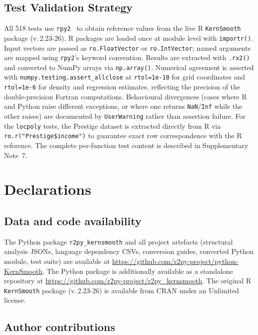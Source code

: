 \documentclass[12pt,a4paper]{article}
\newcommand{\pkg}[1]{\texttt{#1}}
\newcommand{\suppnote}[1]{Supplementary Note~#1}
\begin{document}
\subsection{Test Validation Strategy}

All 518 tests use \pkg{rpy2}~\cite{gautier2008rpy2} to obtain reference values from the live R \pkg{KernSmooth} package (v.\,2.23-26). R packages are loaded once at module level with \texttt{importr()}. Input vectors are passed as \texttt{ro.FloatVector} or \texttt{ro.IntVector}; named arguments are mapped using \texttt{rpy2}'s keyword convention. Results are extracted with \texttt{.rx2()} and converted to NumPy arrays via \texttt{np.array()}. Numerical agreement is asserted with \texttt{numpy.testing.assert\_allclose} at \texttt{rtol=1e-10} for grid coordinates and \texttt{rtol=1e-6} for density and regression estimates, reflecting the precision of the double-precision Fortran computations. Behavioural divergences (cases where R and Python raise different exceptions, or where one returns \texttt{NaN}/\texttt{Inf} while the other raises) are documented by \texttt{UserWarning} rather than assertion failure. For the \texttt{locpoly} tests, the Prestige dataset is extracted directly from R via \texttt{ro.r("Prestige\$income")} to guarantee exact row correspondence with the R reference. The complete per-function test content is described in \suppnote{7}.

\section*{Declarations}

\subsection*{Data and code availability}

The Python package \pkg{r2py\_kernsmooth} and all project artefacts (structural analysis JSONs, language dependency CSVs, conversion guides, converted Python module, test suite) are available at \url{https://github.com/r2py-project/python-KernSmooth}. The Python package is additionally available as a standalone repository at \url{https://github.com/r2py-project/r2py\_kernsmooth}. The original R \pkg{KernSmooth} package (v.\,2.23-26) is available from CRAN under an Unlimited license.

\subsection*{Author contributions}
\end{document}
